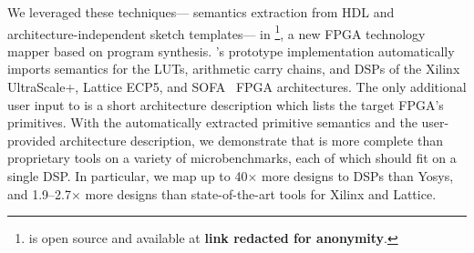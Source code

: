 


We leveraged these techniques---%
  semantics extraction
  from HDL
  and architecture-independent
  sketch templates---%
  in \lr\footnote{
    \lr is open source and available at
    \textbf{link redacted for anonymity}.
  }, a new FPGA technology mapper
  based on program synthesis.
\lr's prototype implementation automatically
  imports semantics for the LUTs, arithmetic carry chains,
  and DSPs of the Xilinx UltraScale+, Lattice ECP5,
  and SOFA~\cite{sofa} FPGA architectures. 
The only additional user input to \lr is a short
  architecture description
  which lists the target FPGA's
  primitives.
With the automatically
  extracted primitive semantics
  and the user-provided architecture description,
  we demonstrate that \lr
  is more complete than proprietary tools on a variety
  of microbenchmarks,
  each of which should fit on a single DSP.
In particular,
  we map up to 40$\times$ 
  more designs to 
  DSPs than Yosys, 
  and 1.9--2.7$\times$ 
  more designs than 
  state-of-the-art
  tools for Xilinx and Lattice.

